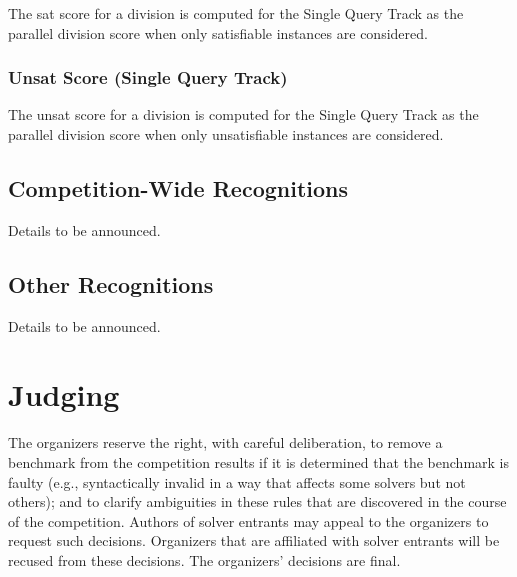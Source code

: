 \documentclass[12pt]{article}
\newcommand{\rem}[1]{\textcolor{red}{[#1]}}
\newcommand{\todo}[1]{\rem{TODO #1}}
\newcommand{\maintrack}{Single Query Track\xspace}
\begin{document}
The sat score for a division is computed for the \maintrack as the
parallel division score when only satisfiable instances are considered.

\subsubsection{Unsat Score (\maintrack)}
The unsat score for a division is computed for the \maintrack as the
parallel division score when only unsatisfiable instances are considered.


\subsection{Competition-Wide Recognitions}

{\color{red} Details to be announced.}

\subsection{Other Recognitions}

{\color{red} Details to be announced.}
\iffalse
The organizers will also recognize the following contributions:
%
\begin{itemize}
\item \emph{Best new entrant}. The best performing entrant from a new
  solver implementation team, as measured by the competition-wide
    metric. \todo{}
\item \emph{Benchmarks}. Contributors of new benchmarks.
\end{itemize}
%
The organizers reserve the right to recognize other outstanding
contributions that become apparent in the competition results.
\fi


\section{Judging}

The organizers reserve the right, with careful deliberation, to remove
a benchmark from the competition results if it is determined that the
benchmark is faulty (e.g., syntactically invalid in a way that affects
some solvers but not others); and to clarify ambiguities in these
rules that are discovered in the course of the competition.  Authors
of solver entrants may appeal to the organizers to request such
decisions.  Organizers that are affiliated with solver entrants will
be recused from these decisions.  The organizers' decisions are final.
\end{document}
